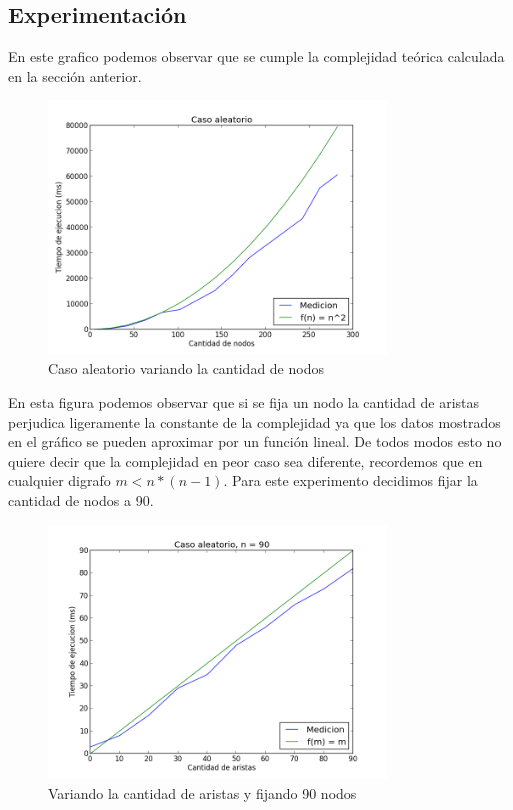\subsection{Experimentaci\'on}

En este grafico podemos observar que se cumple la complejidad te\'orica calculada en la secci\'on anterior.
\begin{figure}[H]
  \centering
  \includegraphics[width=0.8\textwidth]{Problema3/salida}
  \caption{Caso aleatorio variando la cantidad de nodos}
  \label{fig: ej1_exp1_columnas}
\end{figure}
En esta figura podemos observar que si se fija un nodo la cantidad de aristas perjudica ligeramente la constante de la complejidad ya que los datos mostrados en el gr\'afico se pueden aproximar por un funci\'on lineal. De todos modos esto no quiere decir que la complejidad en peor caso sea diferente, recordemos que en cualquier digrafo $m<n*(n-1)$. Para este experimento decidimos fijar la cantidad de nodos a 90.
\begin{figure}[H]
  \centering
  \includegraphics[width=0.8\textwidth]{Problema3/salida2}
  \caption{Variando la cantidad de aristas y fijando 90 nodos}
  \label{fig: ej1_exp1_columnas}
\end{figure}

